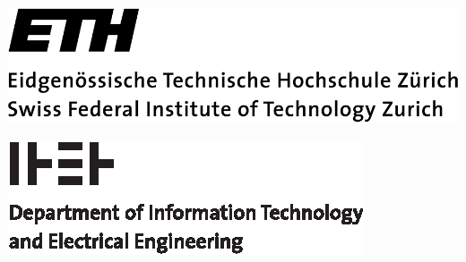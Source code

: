 
{


\begin{minipage}{0.5\textwidth}
	\begin{flushleft}
\includegraphics[scale=0.2]{images/ethlogo-print.png}
	\end{flushleft}
\end{minipage}
\hfill
\begin{minipage}{0.5\textwidth}
	\begin{flushright}
	    \includegraphics[scale=1]{images/itet_logo.eps}
	\end{flushright}
\end{minipage}

\vspace{2cm}
\centering

}
